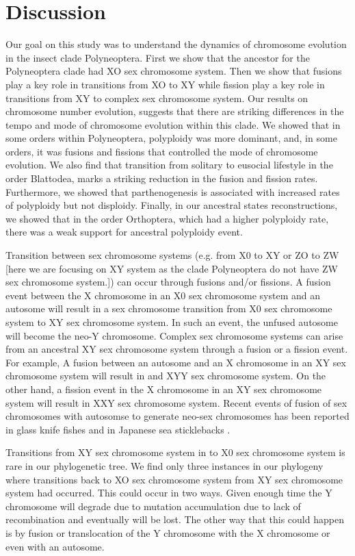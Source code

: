 \section{Discussion}
Our goal on this study was to understand the dynamics of chromosome evolution in the insect clade Polyneoptera. 
First we show that the ancestor for the Polyneoptera clade had XO sex chromosome system. 
Then we show that fusions play a key role in transitions from XO to XY while fission play a key role in transitions from XY to complex sex chromosome system.
Our results on chromosome number evolution, suggests that there are striking differences in the tempo and mode of chromosome evolution within this clade.
We showed that in some orders within Polyneoptera, polyploidy was more dominant, and, in some orders, it was fusions and fissions that controlled the mode of chromosome evolution.
We also find that transition from solitary to eusocial lifestyle in the order Blattodea, marks a striking reduction in the fusion and fission rates.
Furthermore, we showed that parthenogenesis is associated with increased rates of polyploidy but not disploidy.
Finally, in our ancestral states reconstructions, we showed that in the order Orthoptera, which had a higher polyploidy rate, there was a weak support for ancestral polyploidy event. 

Transition between sex chromosome systems (e.g. from X0 to XY or ZO to ZW [here we are focusing on XY system as the clade Polyneoptera do not have ZW sex chromosome system.]) can occur through fusions and/or fissions.
A fusion event between the X chromosome in an X0 sex chromosome system and an autosome will result in a sex chromosome transition from X0 sex chromosome system to XY sex chromosome system. In such an event, the unfused autosome will become the neo-Y chromosome. 
Complex sex chromosome systems can arise from an ancestral XY sex chromosome system through a fusion or a fission event. 
For example, A fusion between an autosome and an X chromosome in an XY sex chromosome system will result in and XYY sex chromosome system. 
On the other hand, a fission event in the X chromosome in an XY sex chromosome system will result in XXY sex chromosome system. 
Recent events of fusion of sex chromosomes with autosomse to generate neo-sex chromosomes has been reported in glass knife fishes \citep{henning2011independent} and in Japanese sea sticklebacks \citep{kitano2012}.

Transitions from XY sex chromosome system in to X0 sex chromosome system is rare in our phylogenetic tree. 
We find only three instances in our phylogeny where transitions back to XO sex chromosome system from XY sex chromosome system had occurred. 
This could occur in two ways.
Given enough time the Y chromosome will degrade due to mutation accumulation due to lack of recombination and eventually will be lost.
The other way that this could happen is by fusion or translocation of the Y chromosome with the X chromosome or even with an autosome. 

